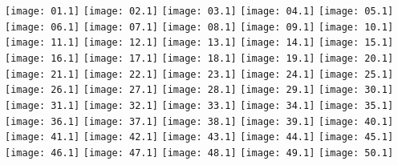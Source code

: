 \documentclass[11pt,a4paper,oneside]{article}
\begin{document}
\raggedbottom

\texttt{[image: 01.1]}
\newpage
\texttt{[image: 02.1]}
\newpage
\texttt{[image: 03.1]}
\newpage
\texttt{[image: 04.1]}
\newpage
\texttt{[image: 05.1]}
\newpage
\texttt{[image: 06.1]}
\newpage
\texttt{[image: 07.1]}
\newpage
\texttt{[image: 08.1]}
\newpage
\texttt{[image: 09.1]}
\newpage
\texttt{[image: 10.1]}
\newpage
\texttt{[image: 11.1]}
\newpage
\texttt{[image: 12.1]}
\newpage
\texttt{[image: 13.1]}
\newpage
\texttt{[image: 14.1]}
\newpage
\texttt{[image: 15.1]}
\newpage
\texttt{[image: 16.1]}
\newpage
\texttt{[image: 17.1]}
\newpage
\texttt{[image: 18.1]}
\newpage
\texttt{[image: 19.1]}
\newpage
\texttt{[image: 20.1]}
\newpage
\texttt{[image: 21.1]}
\newpage
\texttt{[image: 22.1]}
\newpage
\texttt{[image: 23.1]}
\newpage
\texttt{[image: 24.1]}
\newpage
\texttt{[image: 25.1]}
\newpage
\texttt{[image: 26.1]}
\newpage
\texttt{[image: 27.1]}
\newpage
\texttt{[image: 28.1]}
\newpage
\texttt{[image: 29.1]}
\newpage
\texttt{[image: 30.1]}
\newpage
\texttt{[image: 31.1]}
\newpage
\texttt{[image: 32.1]}
\newpage
\texttt{[image: 33.1]}
\newpage
\texttt{[image: 34.1]}
\newpage
\texttt{[image: 35.1]}
\newpage
\texttt{[image: 36.1]}
\newpage
\texttt{[image: 37.1]}
\newpage
\texttt{[image: 38.1]}
\newpage
\texttt{[image: 39.1]}
\newpage
\texttt{[image: 40.1]}
\newpage
\texttt{[image: 41.1]}
\newpage
\texttt{[image: 42.1]}
\newpage
\texttt{[image: 43.1]}
\newpage
\texttt{[image: 44.1]}
\newpage
\texttt{[image: 45.1]}
\newpage
\texttt{[image: 46.1]}
\newpage
\texttt{[image: 47.1]}
\newpage
\texttt{[image: 48.1]}
\newpage
\texttt{[image: 49.1]}
\newpage
\texttt{[image: 50.1]}
\newpage
\end{document}
